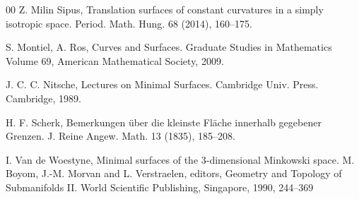 \documentclass[a4paper,12pt]{amsart}
\numberwithin{equation}{section}
\theoremstyle{definition}
\begin{document}
\begin{thebibliography}{00}
 Z. Milin Sipus,   Translation surfaces of constant curvatures in a simply isotropic space. Period. Math. Hung. 68 (2014), 160--175.

 S. Montiel, A. Ros, Curves and Surfaces. Graduate Studies in Mathematics
Volume 69,  American Mathematical Society, 2009.

 

 J. C. C. Nitsche, Lectures on Minimal Surfaces. Cambridge Univ. Press. Cambridge, 1989.

 H. F. Scherk, Bemerkungen \"{u}ber die kleinste Fl\"{a}che innerhalb gegebener Grenzen. J. Reine Angew. Math. 13 (1835), 185--208.

 I. Van de Woestyne, Minimal surfaces of the 3-dimensional Minkowski space. M. Boyom, J.-M. Morvan and L. Verstraelen, editors, Geometry and Topology of Submanifolds II. World Scientific Publishing, Singapore, 1990, 244--369

\end{thebibliography}
\end{document}
